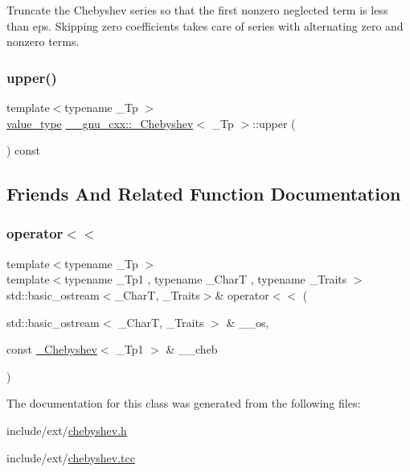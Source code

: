 Truncate the Chebyshev series so that the first nonzero neglected term is less than eps. Skipping zero coefficients takes care of series with alternating zero and nonzero terms. \mbox{\label{class____gnu__cxx_1_1__Chebyshev_a7adf49552809774d062c892174491a3f}} 
\subsubsection{\texorpdfstring{upper()}{upper()}}
{\footnotesize\ttfamily template$<$typename \+\_\+\+Tp $>$ \\
\hyperlink{class____gnu__cxx_1_1__Chebyshev_a7346ba5843311126dc28cb905687c4a1}{value\+\_\+type} \hyperlink{class____gnu__cxx_1_1__Chebyshev}{\+\_\+\+\_\+gnu\+\_\+cxx\+::\+\_\+\+Chebyshev}$<$ \+\_\+\+Tp $>$\+::upper (\begin{DoxyParamCaption}{ }\end{DoxyParamCaption}) const\hspace{0.3cm}{\ttfamily [inline]}}



\subsection{Friends And Related Function Documentation}
\mbox{\label{class____gnu__cxx_1_1__Chebyshev_aa91d6f92fc41ecb09a2989f663ba7d9e}} 
\subsubsection{\texorpdfstring{operator$<$$<$}{operator<<}}
{\footnotesize\ttfamily template$<$typename \+\_\+\+Tp $>$ \\
template$<$typename \+\_\+\+Tp1 , typename \+\_\+\+CharT , typename \+\_\+\+Traits $>$ \\
std\+::basic\+\_\+ostream$<$\+\_\+\+CharT, \+\_\+\+Traits$>$\& operator$<$$<$ (\begin{DoxyParamCaption}\item[{std\+::basic\+\_\+ostream$<$ \+\_\+\+CharT, \+\_\+\+Traits $>$ \&}]{\+\_\+\+\_\+os,  }\item[{const \hyperlink{class____gnu__cxx_1_1__Chebyshev}{\+\_\+\+Chebyshev}$<$ \+\_\+\+Tp1 $>$ \&}]{\+\_\+\+\_\+cheb }\end{DoxyParamCaption})\hspace{0.3cm}{\ttfamily [friend]}}



The documentation for this class was generated from the following files\+:\begin{DoxyCompactItemize}
\item 
include/ext/\hyperlink{chebyshev_8h}{chebyshev.\+h}\item 
include/ext/\hyperlink{chebyshev_8tcc}{chebyshev.\+tcc}\end{DoxyCompactItemize}
